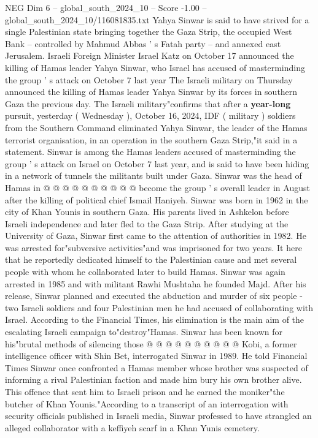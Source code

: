\begin{textsample}{NEG Dim 6 – global\_south\_2024\_10 – Score -1.00 – global\_south\_2024\_10/116081835.txt}  \label{ex:f6_neg_059}
Yahya Sinwar is said to have strived for a single Palestinian state bringing together the Gaza Strip, the occupied West Bank -- controlled by Mahmud Abbas ' s Fatah party -- and annexed east Jerusalem.
Israeli Foreign Minister Israel Katz on October 17 announced the killing of Hamas leader Yahya Sinwar, who Israel has accused of masterminding the group ' s attack on October 7 last year The Israeli military on Thursday announced the killing of Hamas leader Yahya Sinwar by its forces in southern Gaza the previous day.
The Israeli military"confirms that after a \textbf{year-long} pursuit, yesterday ( Wednesday ), October 16, 2024, IDF ( military ) soldiers from the Southern Command eliminated Yahya Sinwar, the leader of the Hamas terrorist organisation, in an operation in the southern Gaza Strip,"it said in a statement.
Sinwar is among the Hamas leaders accused of masterminding the group ' s attack on Israel on October 7 last year, and is said to have been hiding in a network of tunnels the militants built under Gaza.
Sinwar was the head of Hamas in @ @ @ @ @ @ @ @ @ @ become the group ' s overall leader in August after the killing of political chief Ismail Haniyeh.
Sinwar was born in 1962 in the city of Khan Younis in southern Gaza.
His parents lived in Ashkelon before Israeli independence and later fled to the Gaza Strip.
After studying at the University of Gaza, Sinwar first came to the attention of authorities in 1982.
He was arrested for"subversive activities"and was imprisoned for two years.
It here that he reportedly dedicated himself to the Palestinian cause and met several people with whom he collaborated later to build Hamas.
Sinwar was again arrested in 1985 and with militant Rawhi Mushtaha he founded Majd.
After his release, Sinwar planned and executed the abduction and murder of six people - two Israeli soldiers and four Palestinian men he had accused of collaborating with Israel.
According to the Financial Times, his elimination is the main aim of the escalating Israeli campaign to"destroy"Hamas.
Sinwar has been known for his"brutal methods of silencing those @ @ @ @ @ @ @ @ @ @ Kobi, a former intelligence officer with Shin Bet, interrogated Sinwar in 1989.
He told Financial Times Sinwar once confronted a Hamas member whose brother was suspected of informing a rival Palestinian faction and made him bury his own brother alive.
This offence that sent him to Israeli prison and he earned the moniker"the butcher of Khan Younis."According to a transcript of an interrogation with security officials published in Israeli media, Sinwar professed to have strangled an alleged collaborator with a keffiyeh scarf in a Khan Yunis cemetery.

\end{textsample}
